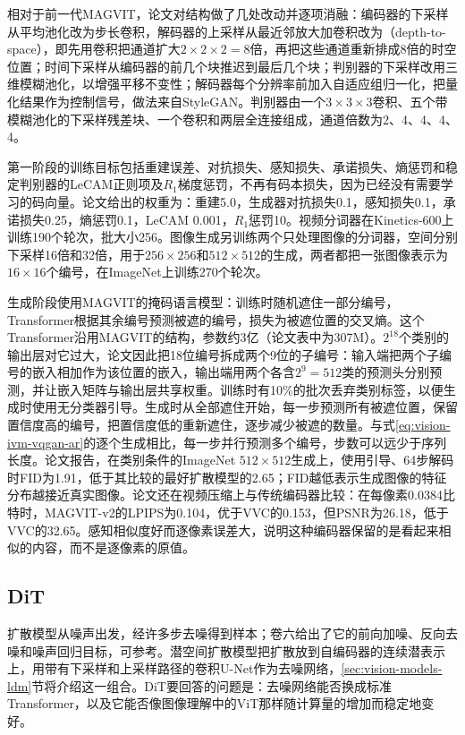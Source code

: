 相对于前一代MAGVIT，论文对结构做了几处改动并逐项消融：编码器的下采样从平均池化改为步长卷积，解码器的上采样从最近邻放大加卷积改为（depth-to-space），即先用卷积把通道扩大$2\times2\times2=8$倍，再把这些通道重新排成8倍的时空位置；时间下采样从编码器的前几个块推迟到最后几个块；判别器的下采样改用三维模糊池化，以增强平移不变性；解码器每个分辨率前加入自适应组归一化，把量化结果作为控制信号，做法来自StyleGAN。判别器由一个$3\times3\times3$卷积、五个带模糊池化的下采样残差块、一个卷积和两层全连接组成，通道倍数为2、4、4、4、4。

第一阶段的训练目标包括重建误差、对抗损失、感知损失、承诺损失、熵惩罚和稳定判别器的LeCAM正则项及$R_1$梯度惩罚，不再有码本损失，因为已经没有需要学习的码向量。论文给出的权重为：重建5.0，生成器对抗损失0.1，感知损失0.1，承诺损失0.25，熵惩罚0.1，LeCAM 0.001，$R_1$惩罚10。视频分词器在Kinetics-600上训练190个轮次，批大小256。图像生成另训练两个只处理图像的分词器，空间分别下采样16倍和32倍，用于$256\times256$和$512\times512$的生成，两者都把一张图像表示为$16\times16$个编号，在ImageNet上训练270个轮次。

生成阶段使用MAGVIT的掩码语言模型：训练时随机遮住一部分编号，Transformer根据其余编号预测被遮的编号，损失为被遮位置的交叉熵。这个Transformer沿用MAGVIT的结构，参数约3亿（论文表中为307M）。$2^{18}$个类别的输出层对它过大，论文因此把18位编号拆成两个9位的子编号：输入端把两个子编号的嵌入相加作为该位置的嵌入，输出端用两个各含$2^9=512$类的预测头分别预测，并让嵌入矩阵与输出层共享权重。训练时有10\%的批次丢弃类别标签，以便生成时使用无分类器引导。生成时从全部遮住开始，每一步预测所有被遮位置，保留置信度高的编号，把置信度低的重新遮住，逐步减少被遮的数量。与式\eqref{eq:vision-ivm-vqgan-ar}的逐个生成相比，每一步并行预测多个编号，步数可以远少于序列长度。论文报告，在类别条件的ImageNet $512\times512$生成上，使用引导、64步解码时FID为1.91，低于其比较的最好扩散模型的2.65；FID越低表示生成图像的特征分布越接近真实图像。论文还在视频压缩上与传统编码器比较：在每像素0.0384比特时，MAGVIT-v2的LPIPS为0.104，优于VVC的0.153，但PSNR为26.18，低于VVC的32.65。感知相似度好而逐像素误差大，说明这种编码器保留的是看起来相似的内容，而不是逐像素的原值。

\subsection{DiT}
\label{sec:vision-ivm-dit}

扩散模型从噪声出发，经许多步去噪得到样本；卷六给出了它的前向加噪、反向去噪和噪声回归目标，可参考。潜空间扩散模型把扩散放到自编码器的连续潜表示上，用带有下采样和上采样路径的卷积U-Net作为去噪网络，\ref{sec:vision-models-ldm}节将介绍这一组合。DiT要回答的问题是：去噪网络能否换成标准Transformer，以及它能否像图像理解中的ViT那样随计算量的增加而稳定地变好。

